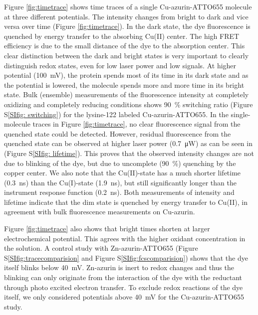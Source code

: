 Figure \ref{fig:timetrace} shows time traces of a single Cu-azurin-ATTO655 molecule at three different potentials. 
The intensity changes from bright to dark and vice versa over time (Figure \ref{fig:timetrace}).
In the dark state, the dye fluorescence is quenched by energy transfer to the absorbing Cu(II) center\cite{kuznetsova2006a}. The high FRET efficiency is due to the small distance of the dye to the absorption center. This clear distinction between the dark and bright states is very important to clearly distinguish redox states, even for low laser power and low signals.
At higher potential (\SI{100}{\mV}), the protein spends most of its time in its dark state and as the potential is lowered, the molecule spends more and more time in its bright state.
Bulk (ensemble) measurements of the fluorescence intensity at completely oxidizing and completely reducing conditions shows \SI{90}{\percent} switching ratio (Figure S\ref{SIfig: switching}) for the lysine-122 labeled Cu-azurin-ATTO655.\cite{nicolardi2012topdown}
In the single-molecule traces in Figure \ref{fig:timetrace}, no clear fluorescence signal from the quenched state could be detected. However, residual fluorescence from the quenched state can be observed at higher laser power (\SI{0.7}{\uW}) as can be seen in (Figure S\ref{SIfig: lifetime}). This proves that the observed intensity changes are not due to blinking of the dye, but due to uncomplete (\SI{90}{\percent}) quenching by the copper center. 
We also note that the Cu(II)-state has a much shorter lifetime (\SI{0.3}{\ns}) than the Cu(I)-state (\SI{1.9}{\ns}), but still significantly longer than the instrument response function (\SI{0.2}{\ns}). 
Both measurements of intensity and lifetime indicate that the dim state is quenched by energy transfer to Cu(II), in agreement with bulk fluorescence measurements on Cu-azurin.

Figure \ref{fig:timetrace} also shows that bright times shorten at larger electrochemical potential. This agrees with the higher oxidant concentration in the solution. 
A control study with Zn-azurin-ATTO655 (Figure S\ref{SIfig:tracecomparision} and Figure S\ref{SIfig:fcscomparision}) shows that the dye itself blinks below \SI{40}{\mV}. Zn-azurin is inert to redox changes and thus the blinking can only originate from the interaction of the dye with the reductant through photo excited electron transfer. To exclude redox reactions of the dye itself, we only considered potentials above \SI{40}{\mV} for the Cu-azurin-ATTO655 study.\\

